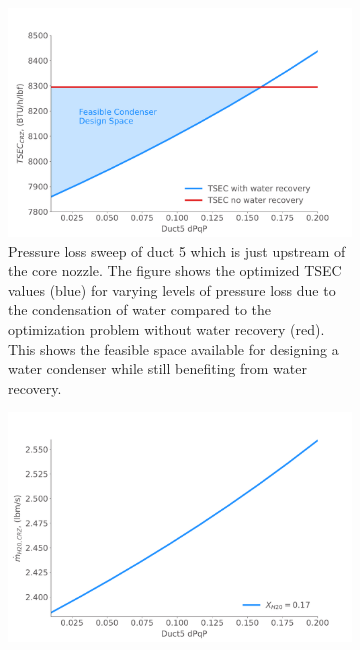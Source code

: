 \documentclass[conf]{new-aiaa}
\begin{document}
\begin{figure}[hbt!]
    \centering
    \begin{subfigure}[t]{0.49\textwidth}
        \includegraphics[width=\textwidth]{N3_dpqp.pdf}
        \caption{
            Pressure loss sweep of duct 5 which is just upstream of the core nozzle.
            The figure shows the optimized TSEC values (blue) for varying levels of pressure loss due to the condensation of water compared to the optimization problem without water recovery (red).
            This shows the feasible space available for designing a water condenser while still benefiting from water recovery.
        }
        \label{fig:dpqp_sweep}
    \end{subfigure}
    \hspace{2pt}
    \begin{subfigure}[t]{0.49\textwidth}
        \includegraphics[width=\textwidth]{N3_wdot.pdf}

\end{subfigure}
\end{figure}
\end{document}
